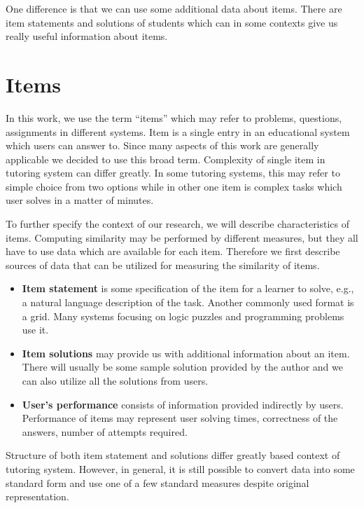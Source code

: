\documentclass[
  digital, %
  table,   %
  nolof,     %
  nolot,     %
  nocover
]{fithesis3}
\begin{document}

One difference is that we can use some additional data about items. There are item statements and solutions of students which can in some contexts give us really useful information about items.

\section{Items}\label{items}



In this work, we use the term ``items'' which may refer to problems, questions, assignments in different systems. Item is a single entry in an educational system which
users can answer to. Since many aspects of this work are generally applicable we decided to use this broad term. Complexity of single item in tutoring system can differ greatly. In some tutoring systems, this may refer to simple choice from two options while in other one item is complex
tasks which user solves in a matter of minutes.


To further specify the context of our research, we will describe characteristics of items. Computing similarity may be performed by different measures, but they all have to use data which are available for each item. Therefore we first describe sources of data that can be utilized for measuring the similarity of items.

\begin{itemize}
\item
  \textbf{Item statement} is some specification of the item for a learner to solve, e.g., a natural language description of the task. Another commonly used format is a grid. Many systems focusing on logic puzzles and programming problems use it.
\item
  \textbf{Item solutions} may provide us with additional information about an item. There will usually be some sample solution provided by the author and we can also utilize all the solutions from users.
\item
  \textbf{User's performance} consists of information provided indirectly by users. Performance of items may represent user solving times, correctness of the answers, number of attempts required.
\end{itemize}

Structure of both item statement and solutions differ greatly based context of tutoring system. However, in general, it is still possible to convert data into some standard form and use one of a few standard measures despite original representation.
\end{document}
